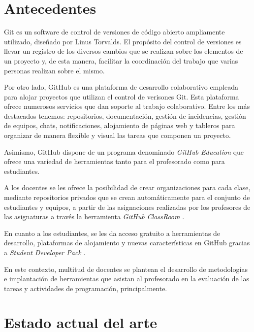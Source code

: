 
\section{Antecedentes}
\label{1:sec:1}

Git es un software de control de versiones de código abierto ampliamente utilizado, diseñado por Linus Torvalds.
El propósito del control de versiones es llevar un registro de los diversos cambios que se realizan sobre
los elementos de un proyecto y, de esta manera, facilitar la coordinación del trabajo que varias personas
realizan sobre el mismo.
\bigskip

Por otro lado, GitHub es una plataforma de desarrollo colaborativo empleada para alojar proyectos que utilizan el control de verisones Git.
Esta plataforma ofrece numerosos servicios que dan soporte al trabajo colaborativo. Entre los más destacados tenemos: repositorios, documentación,
gestión de incidencias, gestión de equipos, chats, notificaciones, alojamiento de páginas web y tableros para organizar de manera flexible y visual las tareas que componen un proyecto.
\bigskip

Asimismo, GitHub dispone de un programa denominado {\it GitHub Education} que ofrece una variedad de herramientas tanto para el profesorado como para estudiantes.
\bigskip

A los docentes se les ofrece la posibilidad de crear organizaciones para cada clase, mediante repositorios privados que se crean automáticamente para el conjunto de estudiantes y equipos,
a partir de las asignaciones realizadas por los profesores de las asignaturas a través la herramienta {\it GitHub ClassRoom }.
\bigskip

En cuanto a los estudiantes, se les da acceso gratuito a herramientas de desarrollo, plataformas de alojamiento y nuevas características en GitHub gracias a {\it Student Developer Pack }.
\bigskip

En este contexto, multitud de docentes se plantean el desarrollo de metodologías e implantación de herramientas
que asistan al profesorado en la evaluación de las tareas y actividades de programación, principalmente.
\section{Estado actual del arte}
\label{1:sec:2}

